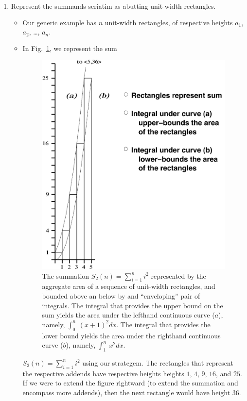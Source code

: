 \begin{enumerate}
\item
Represent the summands seriatim as abutting unit-width rectangles.  
  \begin{itemize}
  \item
Our generic example has $n$ unit-width rectangles, of respective
heights $a_1$, $a_2$, \ldots, $a_n$.

  \item
In Fig.~\ref{fig:riemann-n2}, we represent the sum
\begin{figure}[htb]
\centerline{
\includegraphics[scale=0.42]{riemann.pdf}
}
\caption{The summation $S_2(n) = \sum_{i=1}^n  i^2$ represented by
  the aggregate area of a sequence of unit-width rectangles, and
  bounded above an below by and ``enveloping'' pair of integrals.  The
  integral that provides the upper bound on the sum yields the area
  under the lefthand continuous curve ($a$), namely, $\int_0^n
  \ (x+1)^2 dx$.  The integral that provides the lower bound yields
  the area under the righthand continuous curve ($b$), namely,
  $\int_1^n \ x^2 dx$.}
\label{fig:riemann-n2}
\end{figure}
$S_2(n) = \sum_{i=1}^n  i^2$ using our strategem.  The rectangles
that represent the respective addends have respective heights heights
$1$, $4$, $9$, $16$, and $25$.  If we were to extend the figure
rightward (to extend the summation and encompass more addends), then
the next rectangle would have height $36$.


\end{itemize}
\end{enumerate}

